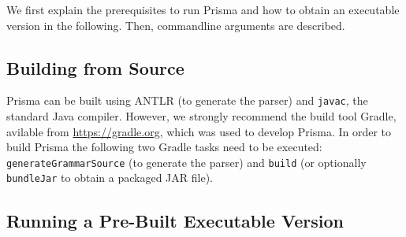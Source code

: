 \documentclass{llncs}
\begin{document}
We first explain the prerequisites to run Prisma and how to obtain an executable version in the following. Then, commandline arguments are described.

\subsection{Building from Source}
\label{sec:build}

Prisma can be built using ANTLR (to generate the parser) and \texttt{javac}, the standard Java compiler. However, we strongly recommend the build tool Gradle, avilable from \url{https://gradle.org}, which was used to develop Prisma. In order to build Prisma the following two Gradle tasks need to be executed: \texttt{generateGrammarSource} (to generate the parser) and \texttt{build} (or optionally \texttt{bundleJar} to obtain a packaged JAR file).

\subsection{Running a Pre-Built Executable Version}
\label{sec:run}
\end{document}
